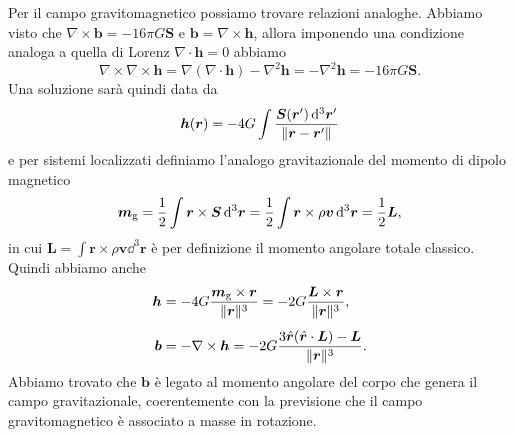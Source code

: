 Per il campo gravitomagnetico possiamo trovare relazioni analoghe.  Abbiamo
visto che $\nabla \times \bm{b} = - 16 \pi G \bm{S}$ e
$\bm{b} = \nabla \times \bm{h}$, allora imponendo una condizione analoga a
quella di Lorenz $\nabla \cdot \bm{h} = 0$ abbiamo
\begin{equation}
  \nabla \times \nabla \times \bm{h} = \nabla (\nabla \cdot \bm{h}) - \nabla^{2}
  \bm{h} = - \nabla^{2} \bm{h} = - 16\pi G \bm{S}.
\end{equation}
Una soluzione sarà quindi data da
\begin{equation}
  \bm{h}(\bm{r}) = - 4 G \int \frac{\bm{S}(\bm{r}') \mathop{}\!\mathrm{d}^{3} \bm{r}'}{\lVert\bm{r}
      - \bm{r}'\rVert}
\end{equation}
e per sistemi localizzati definiamo l'analogo gravitazionale del momento di
dipolo magnetico
\begin{equation}
  \bm{m}_{\textup{g}} = \frac{1}{2} \int \bm{r} \times \bm{S} \mathop{}\!\mathrm{d}^{3} \bm{r} =
  \frac{1}{2} \int \bm{r} \times \rho \bm{v} \mathop{}\!\mathrm{d}^{3} \bm{r} = \frac{1}{2} \bm{L},
\end{equation}
in cui $\bm{L} = \int \bm{r} \times \rho \bm{v} \dd^{3} \bm{r}$ è per
definizione il momento angolare totale classico.  Quindi abbiamo anche
\begin{subequations}
  \begin{align}
    \bm{h} &= - 4G \frac{\bm{m}_{\textup{g}} \times \bm{r}}{\lVert\bm{r}\rVert^{3}} =
    - 2G \frac{\bm{L} \times \bm{r}}{\lVert\bm{r}\rVert^{3}}, \\[1ex]
    \bm{b} &= - \nabla \times \bm{h} = - 2G\frac{3\hat{\bm{r}}(\hat{\bm{r}} \cdot
      \bm{L}) - \bm{L}}{\lVert\bm{r}\rVert^{3}}.
  \end{align}
\end{subequations}
Abbiamo trovato che $\bm{b}$ è legato al momento angolare del corpo che genera
il campo gravitazionale, coerentemente con la previsione che il campo
gravitomagnetico è associato a masse in rotazione.

